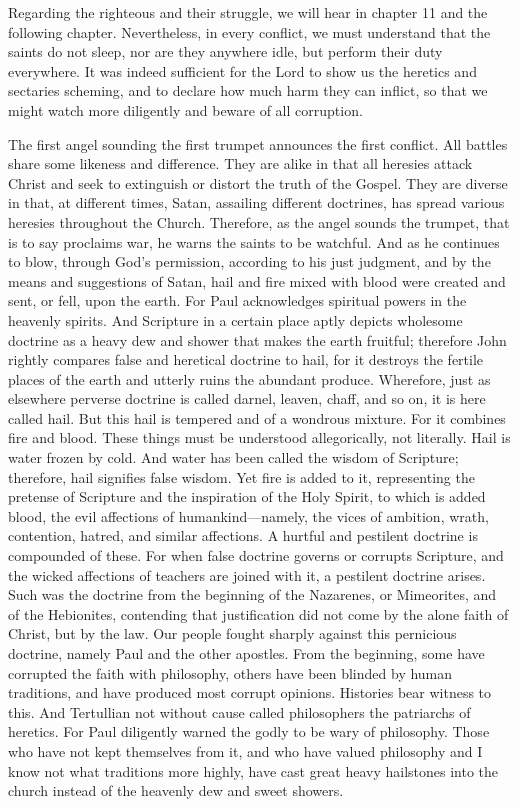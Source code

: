 Regarding the righteous and their struggle, we will hear in chapter 11 and the following chapter. Nevertheless, in every conflict, we must understand that the saints do not sleep, nor are they anywhere idle, but perform their duty everywhere. It was indeed sufficient for the Lord to show us the heretics and sectaries scheming, and to declare how much harm they can inflict, so that we might watch more diligently and beware of all corruption.

The first angel sounding the first trumpet announces the first conflict. All battles share some likeness and difference. They are alike in that all heresies attack Christ and seek to extinguish or distort the truth of the Gospel. They are diverse in that, at different times, Satan, assailing different doctrines, has spread various heresies throughout the Church. Therefore, as the angel sounds the trumpet, that is to say proclaims war, he warns the saints to be watchful. And as he continues to blow, through God’s permission, according to his just judgment, and by the means and suggestions of Satan, hail and fire mixed with blood were created and sent, or fell, upon the earth. For Paul acknowledges spiritual powers in the heavenly spirits. And Scripture in a certain place aptly depicts wholesome doctrine as a heavy dew and shower that makes the earth fruitful; therefore John rightly compares false and heretical doctrine to hail, for it destroys the fertile places of the earth and utterly ruins the abundant produce. Wherefore, just as elsewhere perverse doctrine is called darnel, leaven, chaff, and so on, it is here called hail. But this hail is tempered and of a wondrous mixture. For it combines fire and blood. These things must be understood allegorically, not literally. Hail is water frozen by cold. And water has been called the wisdom of Scripture; therefore, hail signifies false wisdom. Yet fire is added to it, representing the pretense of Scripture and the inspiration of the Holy Spirit, to which is added blood, the evil affections of humankind—namely, the vices of ambition, wrath, contention, hatred, and similar affections. A hurtful and pestilent doctrine is compounded of these. For when false doctrine governs or corrupts Scripture, and the wicked affections of teachers are joined with it, a pestilent doctrine arises. Such was the doctrine from the beginning of the Nazarenes, or Mimeorites, and of the Hebionites, contending that justification did not come by the alone faith of Christ, but by the law. Our people fought sharply against this pernicious doctrine, namely Paul and the other apostles. From the beginning, some have corrupted the faith with philosophy, others have been blinded by human traditions, and have produced most corrupt opinions. Histories bear witness to this. And Tertullian not without cause called philosophers the patriarchs of heretics. For Paul diligently warned the godly to be wary of philosophy. Those who have not kept themselves from it, and who have valued philosophy and I know not what traditions more highly, have cast great heavy hailstones into the church instead of the heavenly dew and sweet showers.

